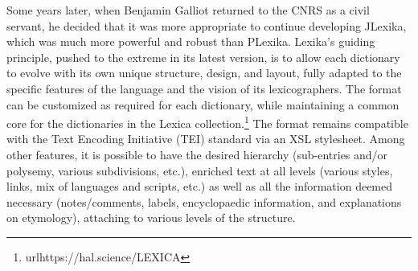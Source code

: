 Some years later, when Benjamin Galliot returned to the CNRS as a civil servant, he decided that it was more appropriate to continue developing JLexika, which was much more powerful and robust than PLexika. Lexika's guiding principle, pushed to the extreme in its latest version, is to allow each dictionary to evolve with its own unique structure, design, and layout, fully adapted to the specific features of the language and the vision of its lexicographers. The format can be customized as required for each dictionary, while maintaining a common core for the dictionaries in the Lexica collection.\footnote{url{https://hal.science/LEXICA}} The format remains compatible with the Text Encoding Initiative (TEI) standard via an XSL stylesheet. Among other features, it is possible to have the desired hierarchy (sub-entries and/or polysemy, various subdivisions, etc.), enriched text at all levels (various styles, links, mix of languages and scripts, etc.) as well as all the information deemed necessary (notes/comments, labels, encyclopaedic information, and explanations on etymology), attaching to various levels of the structure.


